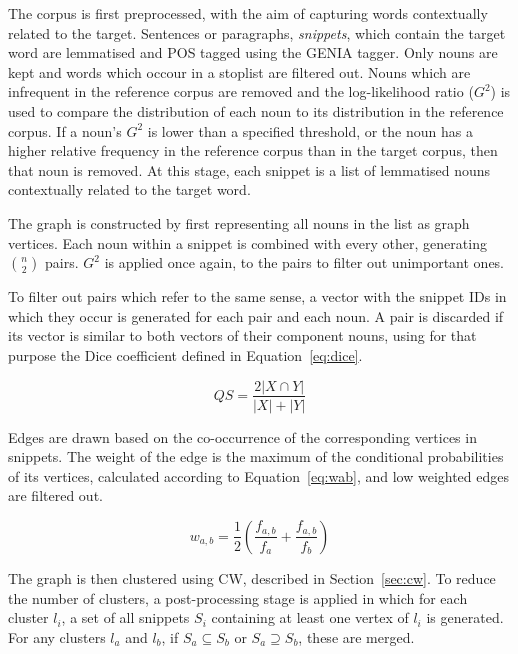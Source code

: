 The corpus is first preprocessed, with the aim of capturing words contextually
related to the target. Sentences or paragraphs, \textit{snippets}, which contain
the target word are lemmatised and \ac{POS} tagged using the GENIA tagger. Only
nouns are kept and words which occour in a stoplist are filtered out. Nouns
which are infrequent in the reference corpus are removed and the log-likelihood
ratio ($G^2$) is used to compare the distribution of each noun to its
distribution in the reference corpus. If a noun's $G^2$ is lower than a
specified threshold, or the noun has a higher relative frequency in the
reference corpus than in the target corpus, then that noun is removed. At this
stage, each snippet is a list of lemmatised nouns contextually related to the
target word.

The graph is constructed by first representing all nouns in the list as graph
vertices. Each noun within a snippet is combined with every other, generating
$\binom{n}{2}$ pairs. $G^2$ is applied once again, to the pairs to filter out
unimportant ones.

To filter out pairs which refer to the same sense, a vector with the snippet IDs
in which they occur is generated for each pair and each noun. A pair is
discarded if its vector is similar to both vectors of their component nouns,
using for that purpose the Dice coefficient defined in Equation~\ref{eq:dice}.

\begin{equation} \label{eq:dice}
 QS = \frac{2 |X \cap Y|}{|X| + |Y|}
\end{equation}

Edges are drawn based on the co-occurrence of the corresponding vertices in
snippets. The weight of the edge is the maximum of the conditional probabilities
of its vertices, calculated according to Equation~\ref{eq:wab}, and low weighted
edges are filtered out.

\begin{equation} \label{eq:wab}
 w_{a,b} = \frac{1}{2} \left( \frac{f_{a,b}}{f_a} + \frac{f_{a,b}}{f_b} \right)
\end{equation}

The graph is then clustered using \ac{CW}, described in Section~\ref{sec:cw}.
To reduce the number of clusters, a post-processing stage is applied in which
for each cluster $l_i$, a set of all snippets $S_i$ containing at least one
vertex of $l_i$ is generated. For any clusters $l_a$ and $l_b$, if
$S_a \subseteq S_b$  or $S_a \supseteq S_b$, these are merged.

